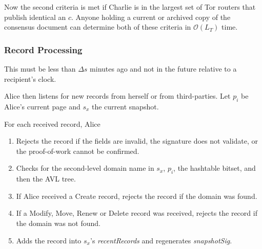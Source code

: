 Now the second criteria is met if Charlie is in the largest set of Tor routers that publish identical an $ c $. Anyone holding a current or archived copy of the consensus document can determine both of these criteria in $ \mathcal{O}(L_{T}) $ time.

\subsubsection{Record Processing}












This must be less than $ \Delta s $ minutes ago and not in the future relative to a recipient's clock.





Alice then listens for new records from herself or from third-parties. Let $ p_{i} $ be Alice's current page and $ s_{x} $ the current snapshot.

For each received record, Alice

\begin{enumerate}
	\item Rejects the record if the fields are invalid, the signature does not validate, or the proof-of-work cannot be confirmed.
	\item Checks for the second-level domain name in $ s_{x} $, $ p_{i} $, the hashtable bitset, and then the AVL tree.
	\item If Alice received a Create record, rejects the record if the domain was found.
	\item If a Modify, Move, Renew or Delete record was received, rejects the record if the domain was not found.
	\item Adds the record into $ s_{x} $'s \emph{recentRecords} and regenerates \emph{snapshotSig}.
\end{enumerate}

